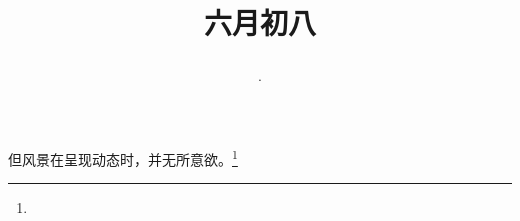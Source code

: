 \title{\date[d=13,m=7,y=2024][year:cn-y,年,month:cn,day:cn,日,·,weekday]·六月初八 }
但风景在呈现动态时，并无所意欲。\footnote{ }


